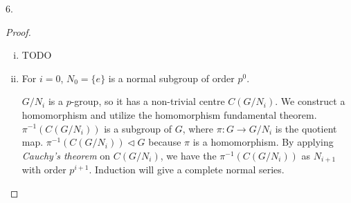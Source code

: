 \begin{exercise}
    6.
\end{exercise}

\begin{proof}

    \begin{enumerate}[(i)]
        \item  TODO
        \item 
         For $i=0$, $N_0=\{e\}$ is a normal subgroup of order $p^0$. 
        
        $G/N_i$ is a $p$-group, so it has a non-trivial centre $C(G/N_i)$. We construct a homomorphism and utilize the homomorphism fundamental theorem. $\pi^{-1}(C(G/N_i))$ is a subgroup of $G$, where $\pi:G\rightarrow G/N_i$ is the quotient map. $\pi^{-1}(C(G/N_i)) \triangleleft G$ because $\pi$ is a homomorphism. By applying \textit{Cauchy's theorem} on $C(G/N_i)$, we have the $\pi^{-1}(C(G/N_i))$ as $N_{i+1}$ with order $p^{i+1}$. Induction will give a complete normal series.
    \end{enumerate}

\end{proof}